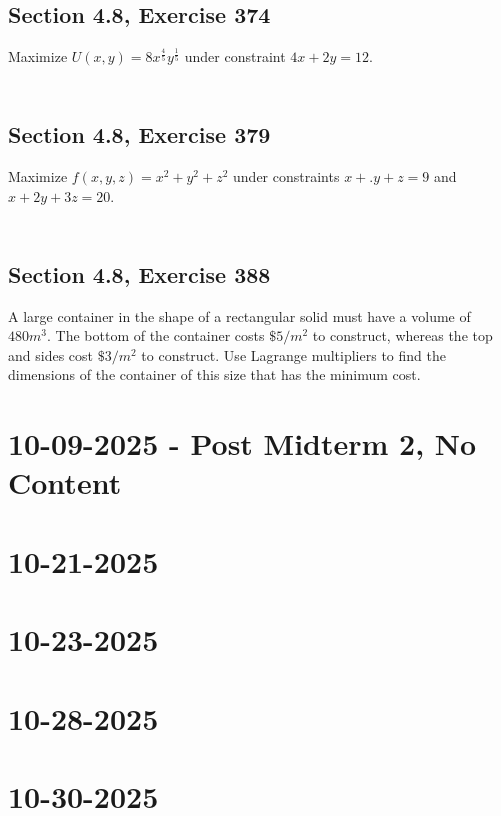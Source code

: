 \documentclass[]{mangos-musings}
\begin{document}
\subsection{Section 4.8, Exercise 374}
Maximize $U(x, y) = 8x^{\frac{4}{5}} y^{\frac{1}{5}}$ under constraint $4x + 2y = 12$.
\begin{align*}
  \\ \\ \\
\end{align*}
\subsection{Section 4.8, Exercise 379}
Maximize $f(x, y, z) = x^2 + y^2 + z^2$ under constraints $x +.y + z = 9$ and $x + 2y + 3z = 20$.
\begin{align*}
  \\ \\ \\
\end{align*}
\subsection{Section 4.8, Exercise 388}
A large container in the shape of a rectangular solid must have a volume of $480 m^3$. The bottom of the container costs $\$5/m^2$ to construct, whereas the top and sides cost $\$3 /m^2$ to construct. Use Lagrange multipliers to find the dimensions of the container of this size that has the minimum cost.


\newpage
\section{10-09-2025 - Post Midterm 2, No Content}

\newpage
\section{10-21-2025}

\newpage
\section{10-23-2025}

\newpage
\section{10-28-2025}

\newpage
\section{10-30-2025}
\end{document}
